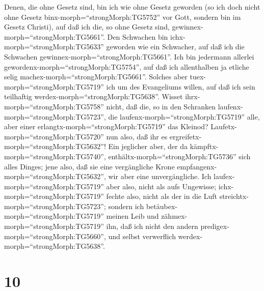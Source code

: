 Denen, die ohne Gesetz sind, bin ich wie ohne Gesetz geworden (so ich
doch nicht ohne Gesetz binx-morph=``strongMorph:TG5752'' vor Gott,
sondern bin im Gesetz Christi), auf daß ich die, so ohne Gesetz sind,
gewinnex-morph=``strongMorph:TG5661''.  Den Schwachen bin
ichx-morph=``strongMorph:TG5633'' geworden wie ein Schwacher, auf daß
ich die Schwachen gewinnex-morph=``strongMorph:TG5661''. Ich bin
jedermann allerlei gewordenx-morph=``strongMorph:TG5754'', auf daß ich
allenthalben ja etliche selig machex-morph=``strongMorph:TG5661''.
 Solches aber tuex-morph=``strongMorph:TG5719'' ich um des
Evangeliums willen, auf daß ich sein teilhaftig
werdex-morph=``strongMorph:TG5638''.  Wisset
ihrx-morph=``strongMorph:TG5758'' nicht, daß die, so in den Schranken
laufenx-morph=``strongMorph:TG5723'', die
laufenx-morph=``strongMorph:TG5719'' alle, aber einer
erlangtx-morph=``strongMorph:TG5719'' das Kleinod?
Laufetx-morph=``strongMorph:TG5720'' nun also, daß ihr es
ergreifetx-morph=``strongMorph:TG5632''!  Ein jeglicher
aber, der da kämpftx-morph=``strongMorph:TG5740'',
enthältx-morph=``strongMorph:TG5736'' sich alles Dinges; jene also, daß
sie eine vergängliche Krone empfangenx-morph=``strongMorph:TG5632'', wir
aber eine unvergängliche.  Ich
laufex-morph=``strongMorph:TG5719'' aber also, nicht als aufs Ungewisse;
ichx-morph=``strongMorph:TG5719'' fechte also, nicht als der in die Luft
streichtx-morph=``strongMorph:TG5723'';  sondern ich
betäubex-morph=``strongMorph:TG5719'' meinen Leib und
zähmex-morph=``strongMorph:TG5719'' ihn, daß ich nicht den andern
predigex-morph=``strongMorph:TG5660'', und selbst verwerflich
werdex-morph=``strongMorph:TG5638''.

\hypertarget{section-9}{%
\section{10}\label{section-9}}

